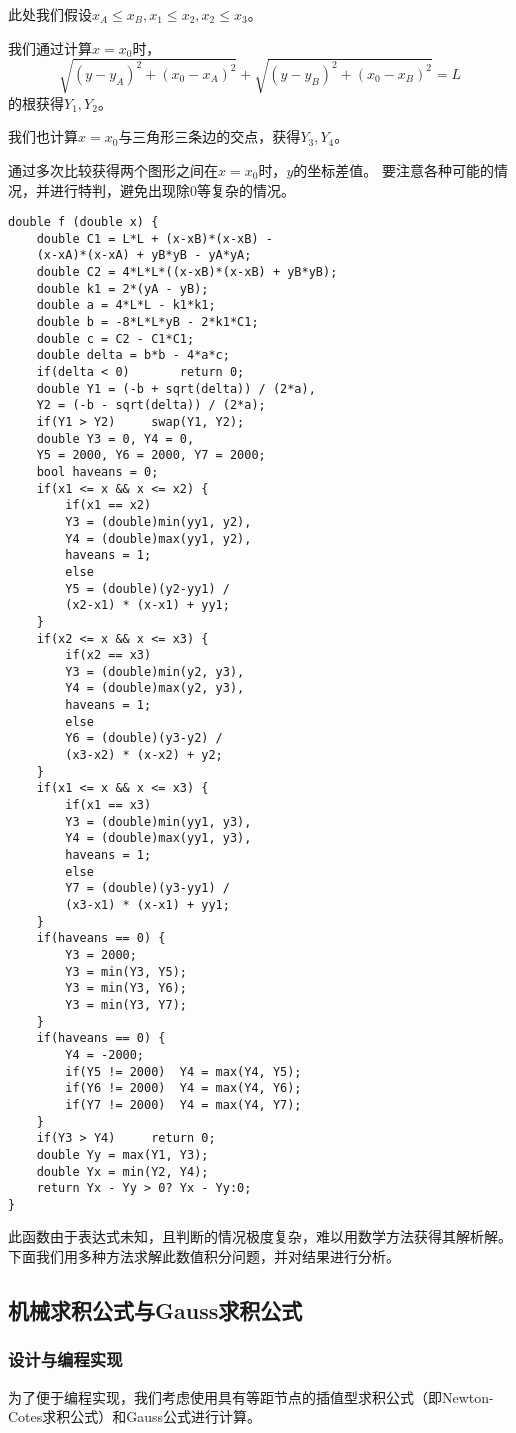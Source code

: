 \documentclass[UTF8]{ctexart}
\begin{document}
	此处我们假设$x_A \leq x_B, x_1 \leq x_2, x_2 \leq x_3$。
	
	我们通过计算$x = x_0$时，
	\[\sqrt{(y-y_A)^2 + (x_0-x_A)^2} + \sqrt{(y-y_B)^2 + (x_0-x_B)^2} = L\]
	的根获得$Y_1, Y_2$。
	
	我们也计算$x = x_0$与三角形三条边的交点，获得$Y_3, Y_4$。
	
	通过多次比较获得两个图形之间在$x = x_0$时，$y$的坐标差值。	要注意各种可能的情况，并进行特判，避免出现除0等复杂的情况。
	
	\lstset{language=C++}%
	
	\begin{lstlisting}
double f (double x) {
	double C1 = L*L + (x-xB)*(x-xB) - 
	(x-xA)*(x-xA) + yB*yB - yA*yA;
	double C2 = 4*L*L*((x-xB)*(x-xB) + yB*yB);
	double k1 = 2*(yA - yB);
	double a = 4*L*L - k1*k1;
	double b = -8*L*L*yB - 2*k1*C1;
	double c = C2 - C1*C1;
	double delta = b*b - 4*a*c;
	if(delta < 0)		return 0;
	double Y1 = (-b + sqrt(delta)) / (2*a), 
	Y2 = (-b - sqrt(delta)) / (2*a);
	if(Y1 > Y2)		swap(Y1, Y2);
	double Y3 = 0, Y4 = 0, 
	Y5 = 2000, Y6 = 2000, Y7 = 2000;
	bool haveans = 0;
	if(x1 <= x && x <= x2) {
		if(x1 == x2)
		Y3 = (double)min(yy1, y2), 
		Y4 = (double)max(yy1, y2),
		haveans = 1;
		else 
		Y5 = (double)(y2-yy1) / 
		(x2-x1) * (x-x1) + yy1;
	}
	if(x2 <= x && x <= x3) {
		if(x2 == x3)
		Y3 = (double)min(y2, y3), 
		Y4 = (double)max(y2, y3),
		haveans = 1;
		else 
		Y6 = (double)(y3-y2) / 
		(x3-x2) * (x-x2) + y2;
	}
	if(x1 <= x && x <= x3) {
		if(x1 == x3)
		Y3 = (double)min(yy1, y3),
		Y4 = (double)max(yy1, y3),
		haveans = 1;
		else 
		Y7 = (double)(y3-yy1) / 
		(x3-x1) * (x-x1) + yy1;
	}
	if(haveans == 0) {
		Y3 = 2000;
		Y3 = min(Y3, Y5);
		Y3 = min(Y3, Y6);
		Y3 = min(Y3, Y7);
	} 
	if(haveans == 0) {
		Y4 = -2000;
		if(Y5 != 2000) 	Y4 = max(Y4, Y5);
		if(Y6 != 2000) 	Y4 = max(Y4, Y6);
		if(Y7 != 2000) 	Y4 = max(Y4, Y7);
	} 
	if(Y3 > Y4)		return 0;
	double Yy = max(Y1, Y3);
	double Yx = min(Y2, Y4);
	return Yx - Yy > 0? Yx - Yy:0;
}
	\end{lstlisting}
	
	此函数由于表达式未知，且判断的情况极度复杂，难以用数学方法获得其解析解。下面我们用多种方法求解此数值积分问题，并对结果进行分析。
	
	\subsection{机械求积公式与Gauss求积公式}
	
	\subsubsection{设计与编程实现}
	为了便于编程实现，我们考虑使用具有等距节点的插值型求积公式（即Newton-Cotes求积公式）和Gauss公式进行计算。
	
\end{document}
